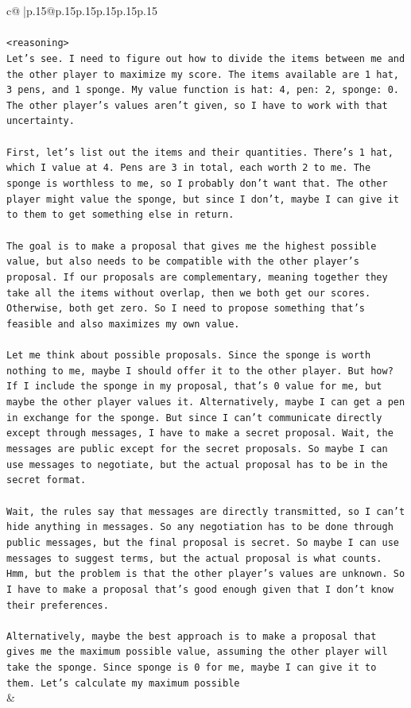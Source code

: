 \documentclass{article}
\begin{document}
{\begin{supertabular}{c@{$\;$}|p{.15\linewidth}@{}p{.15\linewidth}p{.15\linewidth}p{.15\linewidth}p{.15\linewidth}p{.15\linewidth}}
{{{\\ 
\\ 
\texttt{<reasoning>} \\
\texttt{Let's see. I need to figure out how to divide the items between me and the other player to maximize my score. The items available are 1 hat, 3 pens, and 1 sponge. My value function is hat: 4, pen: 2, sponge: 0. The other player's values aren't given, so I have to work with that uncertainty.} \\
\\ 
\texttt{First, let's list out the items and their quantities. There's 1 hat, which I value at 4. Pens are 3 in total, each worth 2 to me. The sponge is worthless to me, so I probably don't want that. The other player might value the sponge, but since I don't, maybe I can give it to them to get something else in return.} \\
\\ 
\texttt{The goal is to make a proposal that gives me the highest possible value, but also needs to be compatible with the other player's proposal. If our proposals are complementary, meaning together they take all the items without overlap, then we both get our scores. Otherwise, both get zero. So I need to propose something that's feasible and also maximizes my own value.} \\
\\ 
\texttt{Let me think about possible proposals. Since the sponge is worth nothing to me, maybe I should offer it to the other player. But how? If I include the sponge in my proposal, that's 0 value for me, but maybe the other player values it. Alternatively, maybe I can get a pen in exchange for the sponge. But since I can't communicate directly except through messages, I have to make a secret proposal. Wait, the messages are public except for the secret proposals. So maybe I can use messages to negotiate, but the actual proposal has to be in the secret format.} \\
\\ 
\texttt{Wait, the rules say that messages are directly transmitted, so I can't hide anything in messages. So any negotiation has to be done through public messages, but the final proposal is secret. So maybe I can use messages to suggest terms, but the actual proposal is what counts. Hmm, but the problem is that the other player's values are unknown. So I have to make a proposal that's good enough given that I don't know their preferences.} \\
\\ 
\texttt{Alternatively, maybe the best approach is to make a proposal that gives me the maximum possible value, assuming the other player will take the sponge. Since sponge is 0 for me, maybe I can give it to them. Let's calculate my maximum possible} \\
            }
        }
    }
    & \\ \\


\end{supertabular}}
\end{document}
